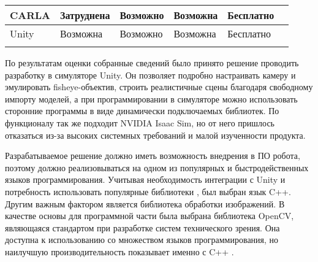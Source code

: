 \begin{table}[H]
\begin{tabular}{|l|l|l|l|l|l|}
    CARLA             & Затруднена                                                                  & Возможно                                                                       & Возможна                                                            & Бесплатно            &                     \\ \hline
    Unity             & Возможна                                                                    & Возможно                                                                       & Возможна                                                            & Бесплатно            &                     \\ \hline
                      &                                                                             &                                                                                &                                                                     &                      &                     \\ \hline
    \end{tabular}
\end{table}

По результатам оценки собранные сведений было принято решение проводить разработку в симуляторе Unity. Он позволяет подробно настраивать камеру и эмулировать fisheye-объектив, 
строить реалистичные сцены благодаря свободному импорту моделей, а при программировании в симуляторе можно использовать сторонние программы в виде динамически подключаемых библиотек. 
По функционалу так же подходит NVIDIA Isaac Sim, но от него пришлось отказаться из-за высоких системных требований и малой изученности продукта.     %

Разрабатываемое решение должно иметь возможность внедрения в ПО робота, %
поэтому должно реализовываться на одном из популярных и быстродейственных языков программирования. Учитывая необходимость интеграции с Unity и потребность использовать популярные библиотеки
, был выбран язык C++.  Другим важным фактором является библиотека обработки изображений. В качестве основы для программной части была выбрана библиотека OpenCV, являющаяся стандартом 
при разработке систем технического зрения. Она доступна к использованию со множеством языков программирования, но наилучшую производительность показывает именно с C++ \cite{}.                              %